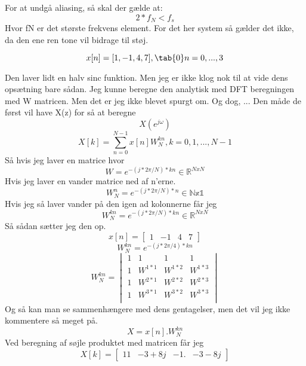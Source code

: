 \begin{rubrik}[Eksamenssæt 2021]
\begin{eksamensOpgave}
\begin{UnderOpgave}
            For at undgå aliasing, så skal der gælde at: 
            \[2*f_N < f_s\]
            Hvor fN er det største frekvens element. 
            For det her system så gælder det ikke, da den ene ren tone vil bidrage til støj.
        \end{UnderOpgave}
    \end{eksamensOpgave}
    \begin{eksamensOpgave}
        \[x[n] = [1, -1, 4, 7], \tab{0} n = 0, ..., 3\]
        \begin{UnderOpgave}
            Den laver lidt en halv sinc funktion. Men jeg er ikke klog nok til at vide dens opsætning bare sådan. 
            Jeg kunne beregne den analytisk med DFT beregningen med W matricen. Men det er jeg ikke blevet spurgt om. Og dog, ...
            Den måde de først vil have X(z) for så at beregne \[X(e^{j\omega})\]
            \[X[k] = \sum_{n = 0}^{N - 1}{x[n] W_N^{kn}},  k = 0, 1, ..., N - 1\]
            Så hvis jeg laver en matrice hvor 
            \[W = e^{-(j * 2\pi/N) * kn } \in \mathbb{R}^{N x N}\]
            Hvis jeg laver en vander matrice ned af n'erne. 
            \[W_N^n = e^{-(j*2\pi/N) * n} \in \mathbb{N x 1}\]
            Hvis jeg så laver vander på den igen ad kolonnerne får jeg
            \[W_N^{kn} = e^{-(j * 2\pi/N) * kn } \in \mathbb{R}^{N x N}\]
            Så sådan sætter jeg den op. 
            \[
            x[n] = [\begin{array}{cccc}
                1 & -1 & 4 & 7
            \end{array}]
            \]
            \[W_N^{kn} = e^{-(j*2\pi/4)*kn}\]
            \[
            W_N^{kn} = 
            \begin{vmatrix}
                1 &         1 &         1 &       1 \\
                1 & W^{1 * 1} & W^{1 * 2} & W^{1*3} \\
                1 & W^{2 * 1} & W^{2 * 2} & W^{2*3} \\
                1 & W^{3 * 1} & W^{3 * 2} & W^{3*3} \\
            \end{vmatrix}\]
            Og så kan man se sammenhængere med dens gentagelser, men det vil jeg ikke kommentere så meget på.
            \[X = x[n].W_N^{kn}\]
            Ved beregning af søjle produktet med matricen får jeg
            \[X[k] = [\begin{array}{cccc} 11 & -3 + 8j & -1. & -3 -8j\end{array}]\]

\end{UnderOpgave}
\end{eksamensOpgave}
\end{rubrik}

